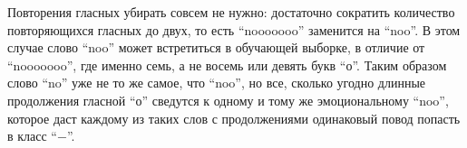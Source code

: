 Повторения гласных убирать совсем не нужно: достаточно сократить количество повторяющихся гласных
до двух, то есть ``nooooooo'' заменится на ``noo''. В этом случае слово ``noo'' может встретиться в
обучающей выборке, в отличие от ``nooooooo'', где именно семь, а не восемь или девять букв
``о''. Таким образом слово ``no'' уже не то же самое, что ``noo'', но все, сколько угодно длинные
продолжения гласной ``о'' сведутся к одному и тому же эмоциональному ``noo'', которое даст каждому
из таких слов с продолжениями одинаковый повод попасть в класс ``$\minus$''.
